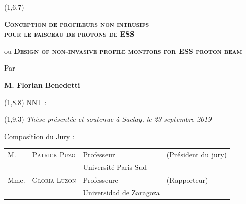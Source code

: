 \begin{titlepage}
	\begin{textblock}{14}(1,6.7)
		\begin{center}	
			\Large \textsc{\textcolor{ESSColor}{
          \textbf{Conception de profileurs non intrusifs \\pour le faisceau de protons de ESS}}}\par ou
          \Large \textsc{\textcolor{ESSColor}{ \textbf{Design of non-invasive profile monitors for ESS proton beam}}}\par          
			\large Par\par  \large \textbf{M. Florian Benedetti} \par
		\end{center}
	\end{textblock}
	
	\begin{textblock}{13}(1,8.8)
		NNT : 
	\end{textblock}
	
	\begin{textblock}{14}(1,9.3)
		\vspace{1.5cm}
		\hspace{1cm}\textit{Thèse présentée et soutenue à Saclay, le 23 septembre 2019}
		\vspace{0.5cm}
		\par
		\hspace{1cm}Composition du Jury :
		\begin{center}
			\begin{tabular}{llll}
				M.    & \textsc{Patrick Puzo}        & Professeur              & (Président du jury)    \\
				\null & \null                        & Université Paris Sud    &                        \\   
				
				Mme.  & \textsc{Gloria Luzon}        & Professeure             & (Rapporteur)           \\
				\null & \null                        & Universidad de Zaragoza &                        \\ 
				

\end{tabular}
\end{center}
\end{textblock}
\end{titlepage}
